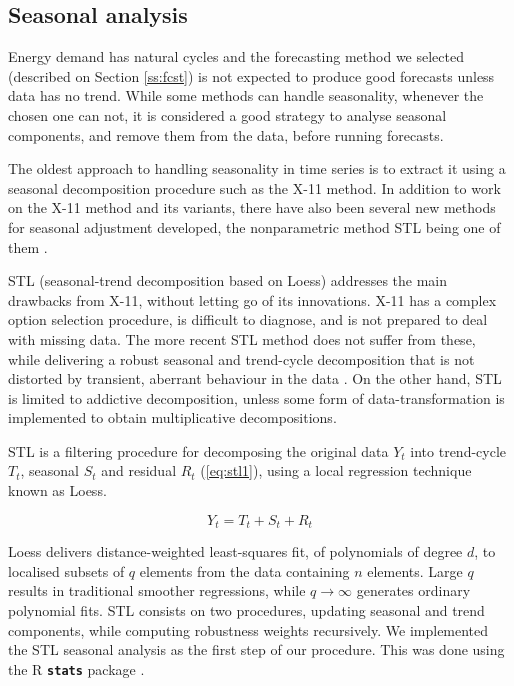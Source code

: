 \documentclass[preprint,3p,12pt,authoryear]{elsarticle}
\begin{document}
\subsection{Seasonal analysis}
\label{ss:dtransf}
Energy demand has natural cycles and the forecasting method we selected (described on Section \ref{ss:fcst}) is not expected to produce good forecasts unless data has no trend.
While some  methods can handle seasonality, whenever the chosen one can not, it is considered a good strategy to analyse seasonal components, and remove them from the data, before running forecasts.

The oldest approach to handling seasonality in time series is to extract it using a seasonal decomposition procedure such as the X-11 method.
In addition to work on the X-11 method and its variants, there have also been several new methods for seasonal adjustment developed, the nonparametric method STL being one of them \citep{DEGOOIJER2006443}.

STL (seasonal-trend decomposition based on Loess) addresses the main drawbacks from X-11, without letting go of its innovations.
X-11 has a complex option selection procedure, is difficult to diagnose, and is not prepared to deal with missing data.
The more recent STL method does not suffer from these, while delivering a robust seasonal and trend-cycle decomposition that is not distorted by transient, aberrant behaviour in the data \citep{cleveland1990stl}.
On the other hand, STL is limited to addictive decomposition, unless some form of data-transformation is implemented to obtain multiplicative decompositions.

STL is a filtering procedure for decomposing the original data $Y_t$ into trend-cycle $T_t$, seasonal $S_t$ and residual $R_t$ (\ref{eq:stl1}), using a local regression technique known as Loess.

\begin{equation}
   Y_t = T_t + S_t + R_t
   \label{eq:stl1}
\end{equation}

Loess delivers distance-weighted least-squares fit, of polynomials of degree $d$, to localised subsets of $q$ elements from the data containing $n$ elements.
Large $q$ results in traditional smoother regressions, while $q\to\infty$ generates ordinary polynomial fits.
STL consists on two procedures, updating seasonal and trend components, while computing robustness weights recursively.
We implemented the STL seasonal analysis as the first step of our procedure.
This was done using the R \texttt{\textbf{stats}} package \citep{r}.
\end{document}
